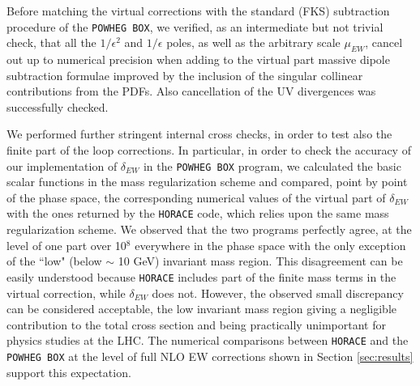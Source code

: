 \documentclass[11pt,a4paper]{article}
\newcommand\POWHEGBOX{\texttt{POWHEG BOX}}
\begin{document}
Before matching the virtual corrections with the standard (FKS)
subtraction procedure of the \POWHEGBOX{}, we verified, as an
intermediate but not trivial check, that all the $1/\epsilon^2$ and
$1/\epsilon$ poles, as well as the arbitrary scale $\mu_{EW}$, cancel
out up to numerical precision when adding to the virtual part massive
\cite{Catani:2002hc} dipole subtraction formulae \cite{Catani:1996jh} 
improved by the inclusion of the singular collinear contributions from 
the PDFs. Also cancellation of the UV divergences was successfully checked.


We performed further stringent internal cross checks, in order to test also
the finite part of the loop corrections. In particular, in order to
check the accuracy of our implementation of $\delta_{EW}$ in the
\POWHEGBOX{} program, we calculated the basic scalar functions in the
mass regularization scheme and compared, point by point of the phase
space, the corresponding numerical values of the virtual part of
$\delta_{EW}$ with the ones returned by the \texttt{HORACE} code,
which relies upon the same mass regularization scheme.  We observed
that the two programs perfectly agree, at the level of one part over
10$^8$ everywhere in the phase space with the only exception of the
``low" (below $\sim$ 10 GeV) invariant mass region. This disagreement
can be easily understood because \texttt{HORACE} includes part of the
finite mass terms in the virtual correction, while $\delta_{EW}$ does
not.  However, the observed small discrepancy can be considered
acceptable, the low invariant mass region giving a negligible
contribution to the total cross section and being practically
unimportant for physics studies at the LHC. The numerical comparisons
between \texttt{HORACE} and the \POWHEGBOX{} at the level of full NLO
EW corrections shown in Section \ref{sec:results} support this
expectation.
\end{document}
